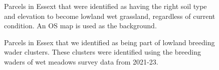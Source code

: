 \documentclass[
  12pt,
  letterpaper,
  DIV=11,
  numbers=noendperiod]{scrartcl}
\begin{document}
\begin{figure}[H]


\caption{\label{fig-EssexSuitHab}Parcels in Essext that were identified
as having the right soil type and elevation to become lowland wet
grassland, regardless of current condition. An OS map is used as the
background.}

\end{figure}%

\begin{figure}[H]


\caption{\label{fig-EssexLawton}Parcels in Essex that we identified as
being part of lowland breeding wader clusters. These clusters were
identified using the breeding waders of wet meadows survey data from
2021-23.}

\end{figure}%
\end{document}

